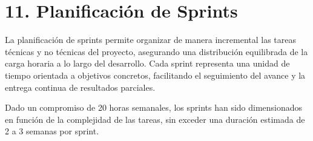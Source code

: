 \documentclass[
11pt, %
]{charter}
\begin{document}
\section{11. Planificación de Sprints}

La planificación de sprints permite organizar de manera incremental las tareas técnicas y no técnicas del proyecto, asegurando una distribución equilibrada de la carga horaria a lo largo del desarrollo. Cada sprint representa una unidad de tiempo orientada a objetivos concretos, facilitando el seguimiento del avance y la entrega continua de resultados parciales.

Dado un compromiso de 20 horas semanales, los sprints han sido dimensionados en función de la complejidad de las tareas, sin exceder una duración estimada de 2 a 3 semanas por sprint.
\end{document}
